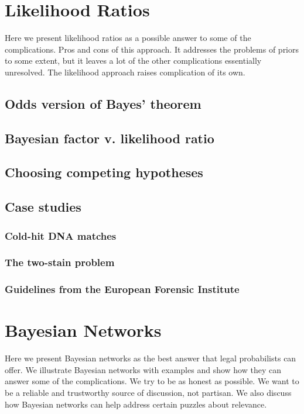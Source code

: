 \documentclass[]{book}
\begin{document}
\chapter{Likelihood Ratios}

Here we present likelihood ratios as a possible answer to some of the
complications. Pros and cons of this approach. It addresses the problems
of priors to some extent, but it leaves a lot of the other complications
essentially unresolved. The likelihood approach raises complication of
its own.

\section{Odds version of Bayes' theorem}

\section{Bayesian factor v. likelihood ratio}

\section{Choosing competing hypotheses}

\section{Case studies}

\subsection{Cold-hit DNA matches}

\subsection{The two-stain problem}

\subsection{Guidelines from the European Forensic Institute}

\chapter{Bayesian Networks}

Here we present Bayesian networks as the best answer that legal
probabilists can offer. We illustrate Bayesian networks with examples
and show how they can answer some of the complications. We try to be as
honest as possible. We want to be a reliable and trustworthy source of
discussion, not partisan. We also discuss how Bayesian networks can help
address certain puzzles about relevance.
\end{document}
